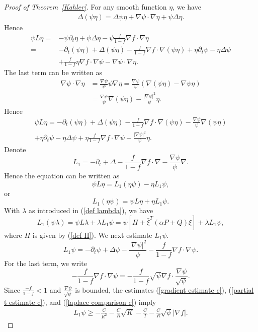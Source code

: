 \documentclass{amsart}
\theoremstyle{definition}
\theoremstyle{remark}
\numberwithin{equation}{section}
\begin{document}
\begin{proof}[Proof of Theorem~\ref{Kahler}]
For any smooth function $\eta$, we have
\[
\begin{aligned}
\Delta(\psi \eta)=\Delta \psi \eta+\nabla \psi \cdot \nabla \eta+\psi \Delta \eta.
\end{aligned}
\]
Hence
\[
\begin{aligned}
\psi L \eta= & -\psi \partial_t \eta+\psi \Delta \eta-\psi \frac{f}{1-f} \nabla f \cdot \nabla \eta \\
= & -\partial_t(\psi \eta)+\Delta(\psi \eta)-\frac{f}{1-f} \nabla f \cdot \nabla(\psi \eta)+\eta \partial_t \psi-\eta \Delta \psi \\
& +\frac{f}{1-f} \eta \nabla f \cdot \nabla \psi-\nabla \psi \cdot \nabla \eta.
\end{aligned}
\]
The last term can be written as
\[
\begin{aligned}
\nabla \psi \cdot \nabla \eta & =\frac{\nabla \psi}{\psi} \psi \nabla \eta=\frac{\nabla \psi}{\psi}(\nabla(\psi \eta)-\nabla \psi \eta) \\
& =\frac{\nabla \psi}{\psi} \nabla(\psi \eta)-\frac{|\nabla \psi|^2}{\psi} \eta.
\end{aligned}
\]
Hence
\begin{align}\label{cutoff equation}
\psi L \eta=-\partial_t(\psi \eta)+\Delta(\psi \eta)-\frac{f}{1-f} \nabla f \cdot \nabla(\psi \eta)-\frac{\nabla \psi}{\psi} \nabla(\psi \eta) \\
+\eta \partial_t \psi-\eta \Delta \psi+\eta \frac{ f}{1-f} \nabla f \cdot \nabla \psi+\frac{|\nabla \psi|^2}{\psi} \eta.
\end{align}
Denote
\begin{equation}
  L_1=-\partial_t+\Delta-\frac{f}{1-f} \nabla f \cdot \nabla-\frac{ \nabla \psi}{\psi} \nabla.
\end{equation}
Hence the equation can be written as
\[
\psi L \eta=L_1(\eta \psi)-\eta L_1 \psi,
\]
or
\[
L_1(\eta \psi)=\psi L \eta+\eta L_1 \psi.
\]
With $\lambda$ as introduced in (\ref{def lambda}), we have
\begin{equation}\label{local lambda}
  L_1(\psi \lambda)=\psi L \lambda+\lambda L_1 \psi=\psi\left[H+\bar{\xi}^T(\alpha P+Q) \xi\right]+\lambda L_1 \psi,
\end{equation}
where $H$ is given by (\ref{def H}). We next estimate $L_1 \psi$.
\[
L_1 \psi=-\partial_t \psi+\Delta \psi-\frac{|\nabla \psi|^2}{\psi}-\frac{f}{1-f} \nabla f \cdot \nabla \psi.
\]
For the last term, we write
\[
-\frac{f}{1-f} \nabla f \cdot \nabla \psi=-\frac{f}{1-f} \sqrt{\psi} \nabla f \cdot \frac{\nabla \psi}{\sqrt{\psi}} .
\]
Since $\frac{-f}{1-f}<1$ and $\frac{\nabla \psi}{\sqrt{\psi}}$ is bounded, the estimates (\ref{gradient estimate c}), (\ref{partial t estimate c}), and (\ref{laplace comparison c}) imply
\begin{align}\label{estimate of psi}
L_{1}\psi\geq -\frac{C}{R^{2}}-\frac{C}{R}\sqrt{K}-\frac{C}{T}-\frac{C}{R}\sqrt{\psi} |\nabla f|.
\end{align}


\end{proof}
\end{document}
